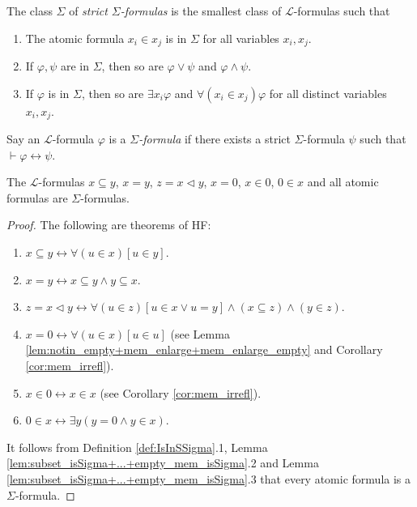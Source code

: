 \begin{definition}
\label{def:IsInSSigma}
\leanok
{}
The class $\Sigma$ of \textit{strict $\Sigma$-formulas} is the smallest class of 
$\mathcal{L}$-formulas such that
\begin{enumerate}
    \item The atomic formula $x_i \in x_j$ is in $\Sigma$ for all variables $x_i, x_j$.
    \item If $\varphi, \psi$ are in $\Sigma$, then so are 
        $\varphi \lor \psi$ and $\varphi \land \psi$.
    \item If $\varphi$ is in $\Sigma$, then so are $\exists x_i \varphi$ and 
        $\forall (x_i \in x_j) \varphi$ for all distinct variables $x_i, x_j$.
\end{enumerate}
\end{definition}

\begin{definition}
    \label{def:IsSigma}
    \leanok
    Say an $\mathcal{L}$-formula $\varphi$ is a \textit{$\Sigma$-formula} 
    if there exists a strict $\Sigma$-formula $\psi$ such that 
    $\vdash \varphi \leftrightarrow \psi$.
\end{definition}

\begin{lemma}
    \label{lem:subset_isSigma+...+empty_mem_isSigma}
    The $\mathcal{L}$-formulas $x \subseteq y$, $x = y$, $z = x \lhd y$, $x=0$, $x\in 0$,
    $0 \in x$ and all atomic formulas are $\Sigma$-formulas.
\end{lemma}

\begin{proof}
    The following are theorems of HF:
    \begin{enumerate}
        \item $x \subseteq y \leftrightarrow \forall (u \in x)[u \in y]$.
        \item $x = y \leftrightarrow x \subseteq y \land y \subseteq x$.
        \item $z = x \lhd y \leftrightarrow \forall(u \in z)[u \in x \lor u = y] 
        \land (x \subseteq z) \land (y \in z)$.
        \item $x = 0 \leftrightarrow \forall (u \in x)[u \in u]$ (see Lemma 
        \ref{lem:notin_empty+mem_enlarge+mem_enlarge_empty} and Corollary \ref{cor:mem_irrefl}).
        \item $x \in 0 \leftrightarrow x \in x$ (see Corollary \ref{cor:mem_irrefl}).
        \item $0 \in x \leftrightarrow \exists y (y = 0 \land y \in x)$.
    \end{enumerate}
    It follows from Definition \ref{def:IsInSSigma}.1, 
    Lemma \ref{lem:subset_isSigma+...+empty_mem_isSigma}.2 and 
    Lemma \ref{lem:subset_isSigma+...+empty_mem_isSigma}.3 that every atomic formula is a
    $\Sigma$-formula.
\end{proof}

